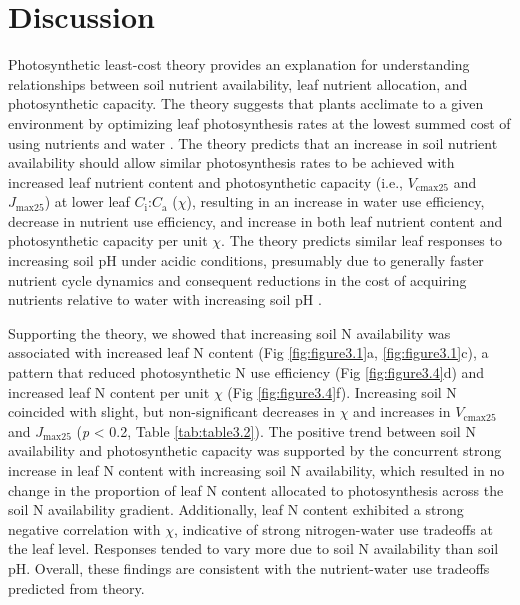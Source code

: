 \section{Discussion}
Photosynthetic least-cost theory provides an explanation for understanding relationships between soil nutrient availability, leaf nutrient allocation, and photosynthetic capacity. The theory suggests that plants acclimate to a given environment by optimizing leaf photosynthesis rates at the lowest summed cost of using nutrients and water . The theory predicts that an increase in soil nutrient availability should allow similar photosynthesis rates to be achieved with increased leaf nutrient content and photosynthetic capacity (i.e., $V_\mathrm{cmax25}$ and $J_\mathrm{max25}$) at lower leaf $C_\mathrm{i}$:$C_\mathrm{a}$ ($\chi$), resulting in an increase in water use efficiency, decrease in nutrient use efficiency, and increase in both leaf nutrient content and photosynthetic capacity per unit $\chi$. The theory predicts similar leaf responses to increasing soil pH under acidic conditions, presumably due to generally faster nutrient cycle dynamics and consequent reductions in the cost of acquiring nutrients relative to water with increasing soil pH .
    
Supporting the theory, we showed that increasing soil N availability was associated with increased leaf N content (Fig \ref{fig:figure3.1}a, \ref{fig:figure3.1}c), a pattern that reduced photosynthetic N use efficiency (Fig \ref{fig:figure3.4}d) and increased leaf N content per unit $\chi$ (Fig \ref{fig:figure3.4}f). Increasing soil N coincided with slight, but non-significant decreases in $\chi$ and increases in $V_\mathrm{cmax25}$ and $J_\mathrm{max25}$ (\textit{p} < 0.2, Table \ref{tab:table3.2}). The positive trend between soil N availability and photosynthetic capacity was supported by the concurrent strong increase in leaf N content with increasing soil N availability, which resulted in no change in the proportion of leaf N content allocated to photosynthesis across the soil N availability gradient. Additionally, leaf N content exhibited a strong negative correlation with $\chi$, indicative of strong nitrogen-water use tradeoffs at the leaf level. Responses tended to vary more due to soil N availability than soil pH. Overall, these findings are consistent with the nutrient-water use tradeoffs predicted from theory.

